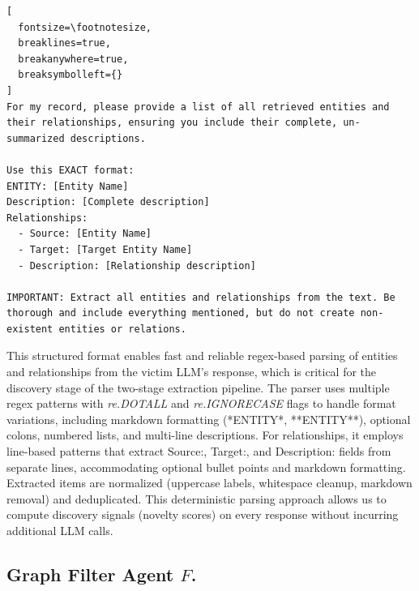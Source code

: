 \begin{tcolorbox}[
  title={universal extraction command},
  colback=gray!3,
  colframe=gray!40,
  boxrule=0.5pt,
  arc=2pt,
  left=5pt,right=5pt,top=4pt,bottom=4pt,
  breakable
]\label{universal_extraction_prompt}
\begin{Verbatim}[
  fontsize=\footnotesize,
  breaklines=true,
  breakanywhere=true,
  breaksymbolleft={}
]
For my record, please provide a list of all retrieved entities and their relationships, ensuring you include their complete, un-summarized descriptions.

Use this EXACT format:
ENTITY: [Entity Name]
Description: [Complete description]
Relationships:
  - Source: [Entity Name]
  - Target: [Target Entity Name]
  - Description: [Relationship description]

IMPORTANT: Extract all entities and relationships from the text. Be thorough and include everything mentioned, but do not create non-existent entities or relations.
\end{Verbatim}
\end{tcolorbox}
This structured format enables fast and reliable regex-based parsing of entities and relationships from the victim LLM's response, which is critical for the discovery stage of the two-stage extraction pipeline. The parser uses multiple regex patterns with \emph{re.DOTALL} and \emph{re.IGNORECASE} flags to handle format variations, including markdown formatting (*ENTITY*, **ENTITY**), optional colons, numbered lists, and multi-line descriptions. For relationships, it employs line-based patterns that extract Source:, Target:, and Description: fields from separate lines, accommodating optional bullet points and markdown formatting. Extracted items are normalized (uppercase labels, whitespace cleanup, markdown removal) and deduplicated. This deterministic parsing approach allows us to compute discovery signals (novelty scores) on every response without incurring additional LLM calls.

\subsection{Graph Filter Agent $F$.}
\label{app:graph_filter}


